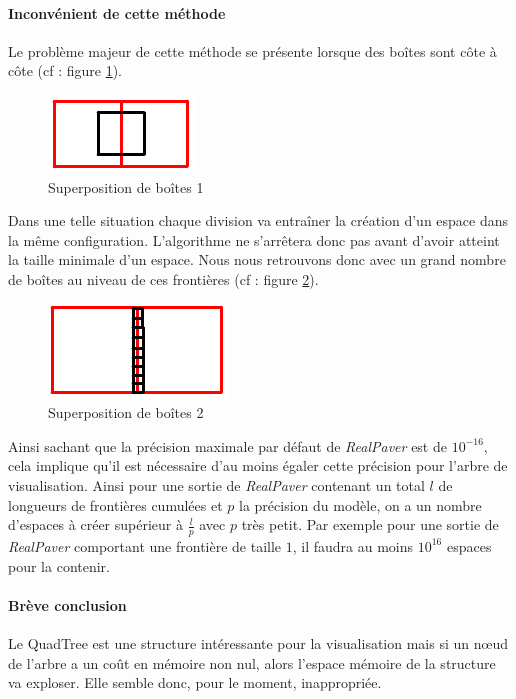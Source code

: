 \paragraph{Inconvénient de cette méthode}Le problème majeur de cette méthode se présente lorsque des boîtes sont côte à côte (cf : figure \ref{fig:frontiere}).
\begin{figure}[htbp]
\centering
\includegraphics[scale=0.40]{img/QT7}
\caption{Superposition de boîtes 1}
\label{fig:frontiere}
\end{figure}
Dans une telle situation chaque division va entraîner la création d'un espace dans la même configuration. L'algorithme ne s'arrêtera donc pas avant d'avoir atteint la taille minimale d'un espace. Nous nous retrouvons donc avec un grand nombre de boîtes au niveau de ces \og frontières\fg{} (cf : figure \ref{fig:frontiere2}).
\begin{figure}[htbp]
\centering
\includegraphics[scale=0.40]{img/QT9}
\caption{Superposition de boîtes 2}
\label{fig:frontiere2}
\end{figure}
Ainsi sachant que la précision maximale par défaut de \emph{RealPaver} est de $10^{-16}$, cela implique qu'il est nécessaire d'au moins égaler cette précision pour l'arbre de visualisation. Ainsi pour une sortie de \emph{RealPaver} contenant un total $l$ de longueurs de \og frontières \fg{}  cumulées et $p$ la précision du modèle, on a un nombre d'espaces à créer supérieur à $\frac{l}{p}$ avec $p$ très petit. Par exemple pour une sortie de \emph{RealPaver} comportant une \og frontière \fg{} de taille $1$, il faudra au moins $10^{16}$ espaces pour la contenir. 

\paragraph{Brève conclusion} Le QuadTree est une structure intéressante pour la visualisation mais si un nœud de l'arbre a un coût en mémoire non nul, alors l'espace mémoire de la structure va exploser. Elle semble donc, pour le moment, inappropriée.

